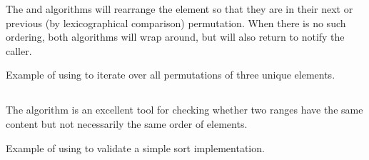 The  and  algorithms will rearrange the element so that they are in their next or previous (by lexicographical comparison) permutation. When there is no such ordering, both algorithms will wrap around, but will also return  to notify the caller.


\begin{codebox}[]{\href{https://compiler-explorer.com/z/shfGz3brv}{\ExternalLink}}
\footnotesize Example of using  to iterate over all permutations of three unique elements.
\tcblower
{}
\end{codebox}

\subsection{\texorpdfstring{}{\texttt{std::is\_permutation}}}

The  algorithm is an excellent tool for checking whether two ranges have the same content but not necessarily the same order of elements.


\begin{codebox}[]{\href{https://compiler-explorer.com/z/axqfP6aaT}{\ExternalLink}}
\footnotesize Example of using  to validate a simple sort implementation.
\tcblower
{}
\end{codebox}
